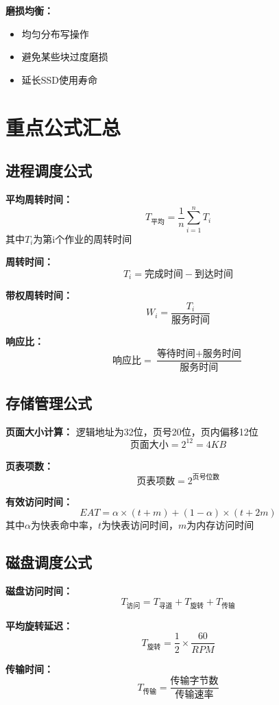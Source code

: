 \documentclass[lang=cn,newtx,10pt,scheme=chinese]{../../elegantbook}
\begin{document}
\textbf{磨损均衡：}
\begin{itemize}
  \item 均匀分布写操作
  \item 避免某些块过度磨损
  \item 延长SSD使用寿命
\end{itemize}

\chapter{重点公式汇总}

\section{进程调度公式}

\textbf{平均周转时间：}
$$T_{平均} = \frac{1}{n}\sum_{i=1}^{n}T_i$$
其中$T_i$为第i个作业的周转时间

\textbf{周转时间：}
$$T_i = \text{完成时间} - \text{到达时间}$$

\textbf{带权周转时间：}
$$W_i = \frac{T_i}{\text{服务时间}}$$

\textbf{响应比：}
$$\text{响应比} = \frac{\text{等待时间} + \text{服务时间}}{\text{服务时间}}$$

\section{存储管理公式}

\textbf{页面大小计算：}
逻辑地址为32位，页号20位，页内偏移12位
$$\text{页面大小} = 2^{12} = 4KB$$

\textbf{页表项数：}
$$\text{页表项数} = 2^{\text{页号位数}}$$

\textbf{有效访问时间：}
$$EAT = \alpha \times (t + m) + (1-\alpha) \times (t + 2m)$$
其中$\alpha$为快表命中率，$t$为快表访问时间，$m$为内存访问时间

\section{磁盘调度公式}

\textbf{磁盘访问时间：}
$$T_{\text{访问}} = T_{\text{寻道}} + T_{\text{旋转}} + T_{\text{传输}}$$

\textbf{平均旋转延迟：}
$$T_{\text{旋转}} = \frac{1}{2} \times \frac{60}{RPM}$$

\textbf{传输时间：}
$$T_{\text{传输}} = \frac{\text{传输字节数}}{\text{传输速率}}$$
\end{document}
